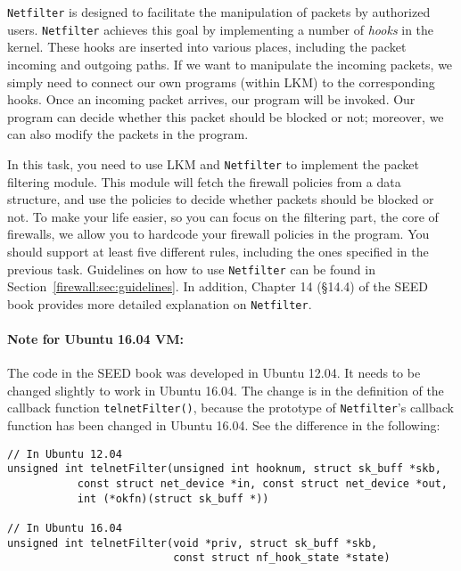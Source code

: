 {\tt Netfilter} is designed to facilitate the manipulation of 
packets by authorized users. {\tt Netfilter} achieves this 
goal by implementing a number of {\em hooks} in the 
\linux kernel. These hooks are inserted into various places, 
including the packet incoming and outgoing paths. 
If we want to manipulate the incoming packets, we simply
need to connect our own programs (within LKM) to the 
corresponding hooks. Once an incoming packet arrives, 
our program will be invoked. Our program can decide 
whether this packet should be blocked or not; moreover,
we can also modify the packets in the program.


In this task, you need to use LKM and {\tt Netfilter} to implement
the packet filtering module.  This module will fetch 
the firewall policies from a data structure, and use the 
policies to decide whether packets should be blocked or not.
To make your life easier, so you can focus on the filtering part, 
the core of firewalls, we allow you to hardcode your firewall policies 
in the program. You should support at least five different 
rules, including the ones specified in the previous task. 
Guidelines on how to use \texttt{Netfilter} can be 
found in Section~\ref{firewall:sec:guidelines}. In addition, 
Chapter 14 (\S 14.4) of the SEED book provides more detailed explanation on \texttt{Netfilter}. 


\paragraph{Note for Ubuntu 16.04 VM:}
The code in the SEED book was developed in Ubuntu 12.04. It needs to be changed slightly 
to work in Ubuntu 16.04. The change is in the definition of the 
callback function \texttt{telnetFilter()}, because
the prototype of \texttt{Netfilter}'s callback function has been changed in
Ubuntu 16.04. See the difference in the following:


\begin{lstlisting}
// In Ubuntu 12.04
unsigned int telnetFilter(unsigned int hooknum, struct sk_buff *skb,
           const struct net_device *in, const struct net_device *out,
           int (*okfn)(struct sk_buff *)) 

// In Ubuntu 16.04
unsigned int telnetFilter(void *priv, struct sk_buff *skb,
                          const struct nf_hook_state *state)
\end{lstlisting}
 




